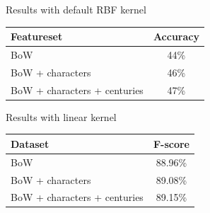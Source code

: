 \documentclass[10pt]{beamer}
\begin{document}
\begin{frame}[fragile]{Results with default RBF kernel}
  
\begin{tabular}{l c}
   Featureset & Accuracy \\
   \hline
   BoW & 44\% \\
   BoW + characters & 46\% \\
   BoW + characters + centuries & 47\% \\
\end{tabular}

\end{frame}




  


  


  





\begin{frame}[fragile]{Results with linear kernel}
  
\begin{tabular}{l c}
  Dataset & F-score \\
  \hline
  BoW & 88.96\% \\
  BoW + characters & 89.08\% \\
  BoW + characters + centuries & 89.15\% \\
    
\end{tabular}

\end{frame}
\end{document}
